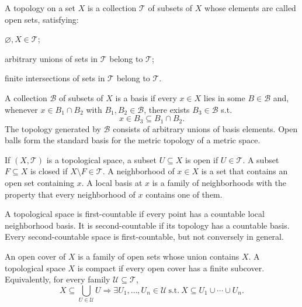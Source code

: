    \begin{definition}[Topology]
        A topology on a set $X$ is a collection $\mathcal{T}$ of subsets of $X$
        whose elements are called open sets, satisfying:
        \begin{conditionlist}
            \item $\varnothing,X\in\mathcal{T}$;
            \item arbitrary unions of sets in $\mathcal{T}$ belong to
            $\mathcal{T}$;
            \item finite intersections of sets in $\mathcal{T}$ belong to
            $\mathcal{T}$.
        \end{conditionlist}
    \end{definition}


    \begin{definition}
        A collection $\mathcal{B}$ of subsets of $X$ is a basis if every
        $x\in X$ lies in some $B\in\mathcal{B}$ and, whenever
        $x\in B_1\cap B_2$ with $B_1,B_2\in\mathcal{B}$, there exists
        $B_3\in\mathcal{B}$ s.t.
        \[
            x\in B_3\subseteq B_1\cap B_2.
        \]
        The topology generated by $\mathcal{B}$ consists of arbitrary unions
        of basis elements. Open balls form the standard basis for the metric
        topology of a metric space.
    \end{definition}


    \begin{definition}
        If $(X,\mathcal{T})$ is a topological space, a subset $U\subseteq X$ is
        open if $U\in\mathcal{T}$. A subset $F\subseteq X$ is closed if
        $X\setminus F\in\mathcal{T}$. A neighborhood of $x\in X$ is a set that
        contains an open set containing $x$. A local basis at $x$ is a family
        of neighborhoods with the property that every neighborhood of $x$
        contains one of them.
    \end{definition}

    \begin{definition}
        A topological space is first-countable if every point has a countable
        local neighborhood basis. It is second-countable if its topology has a
        countable basis. Every second-countable space is first-countable, but
        not conversely in general.
    \end{definition}

    \begin{definition}[Compactness]
        An open cover of $X$ is a family of open sets whose union contains
        $X$. A topological space $X$ is compact if every open cover has a finite
        subcover. Equivalently, for every family $\mathcal{U}\subseteq\mathcal{T}$,
        \[
            X\subseteq\bigcup_{U\in\mathcal{U}}U
            \Rightarrow
            \exists U_1,\dots,U_n\in\mathcal{U}
            \ \text{s.t.}\
            X\subseteq U_1\cup\cdots\cup U_n.
        \]
    \end{definition}

